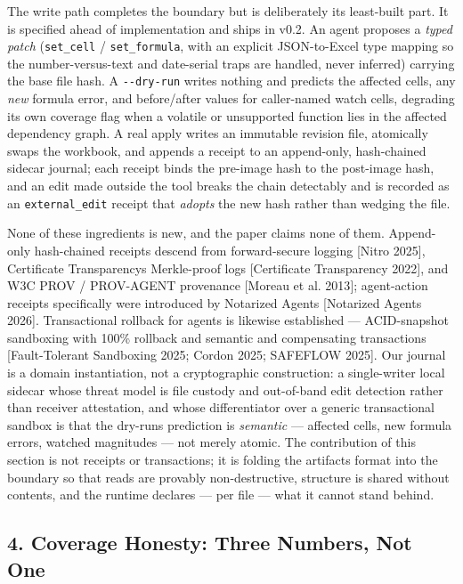 \documentclass[
]{article}
\newcounter{none} %
\begin{document}
The write path completes the boundary but is deliberately its
least-built part. It is specified ahead of implementation and ships in
v0.2. An agent proposes a \emph{typed patch} (\texttt{set\_cell} /
\texttt{set\_formula}, with an explicit JSON-to-Excel type mapping so
the number-versus-text and date-serial traps are handled, never
inferred) carrying the base file hash. A \texttt{-\/-dry-run} writes
nothing and predicts the affected cells, any \emph{new} formula error,
and before/after values for caller-named watch cells, degrading its own
coverage flag when a volatile or unsupported function lies in the
affected dependency graph. A real apply writes an immutable revision
file, atomically swaps the workbook, and appends a receipt to an
append-only, hash-chained sidecar journal; each receipt binds the
pre-image hash to the post-image hash, and an edit made outside the tool
breaks the chain detectably and is recorded as an
\texttt{external\_edit} receipt that \emph{adopts} the new hash rather
than wedging the file.

None of these ingredients is new, and the paper claims none of them.
Append-only hash-chained receipts descend from forward-secure logging
{[}Nitro 2025{]}, Certificate Transparency\textquotesingle s
Merkle-proof logs {[}Certificate Transparency 2022{]}, and W3C PROV /
PROV-AGENT provenance {[}Moreau et al. 2013{]}; agent-action receipts
specifically were introduced by Notarized Agents {[}Notarized Agents
2026{]}. Transactional rollback for agents is likewise established ---
ACID-snapshot sandboxing with 100\% rollback and semantic and
compensating transactions {[}Fault-Tolerant Sandboxing 2025; Cordon
2025; SAFEFLOW 2025{]}. Our journal is a domain instantiation, not a
cryptographic construction: a single-writer local sidecar whose threat
model is file custody and out-of-band edit detection rather than
receiver attestation, and whose differentiator over a generic
transactional sandbox is that the dry-run\textquotesingle s prediction
is \emph{semantic} --- affected cells, new formula errors, watched
magnitudes --- not merely atomic. The contribution of this section is
not receipts or transactions; it is folding the
artifact\textquotesingle s format into the boundary so that reads are
provably non-destructive, structure is shared without contents, and the
runtime declares --- per file --- what it cannot stand behind.

\subsection{4. Coverage Honesty: Three Numbers, Not
One}\label{4-coverage-honesty-three-numbers-not-one}
\end{document}
